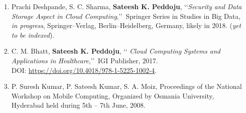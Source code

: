 
\begin{enumerate}%
	
	\item%
	Prachi Deshpande, S. C. Sharma, \textbf{Sateesh K. Peddoju},
	\lq\lq \emph{Security and Data Storage Aspect in Cloud Computing},\rq\rq\, Springer Series in
	Studies in Big Data, \textit{in progress}, Springer--Verlag, Berlin--Heidelberg,
	Germany, likely in 2018. (\emph{yet to be indexed}).
		
	\item%
	C. M. Bhatt, \textbf{Sateesh K. Peddoju}, \lq\lq
	\emph{Cloud Computing Systems and Applications in Healthcare},\rq\rq\, IGI Publisher, 2017. \\DOI: \url{https://doi.org/10.4018/978-1-5225-1002-4}.

\item%
	P. Suresh Kumar, P. Sateesh Kumar, S. A. Moiz, Proceedings of the National Workshop on Mobile Computing, Organized by Osmania University, Hyderabad held during 5th – 7th June, 2008.
	
\end{enumerate}

